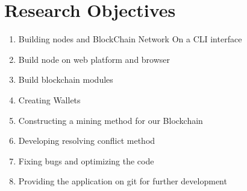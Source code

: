 \section{Research Objectives}
\begin{enumerate}
\item Building nodes and BlockChain Network On a CLI interface
\item Build node on web platform and browser
\item Build blockchain modules
\item Creating Wallets
\item Constructing a mining method for our Blockchain
\item Developing resolving conflict method
\item Fixing bugs and optimizing the code
\item Providing the application on git for further development

\end{enumerate}
